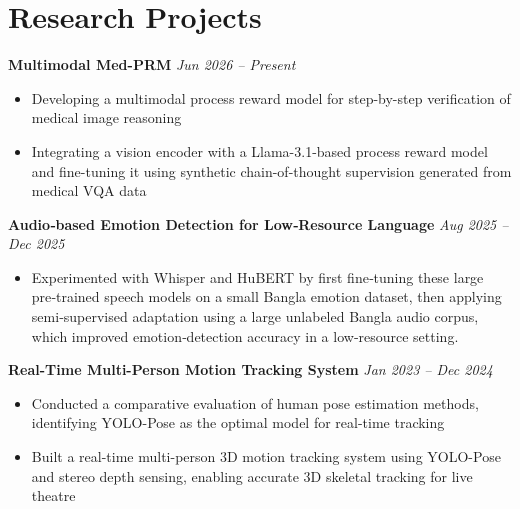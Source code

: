 \documentclass[10pt,letterpaper]{article}
\newcommand{\headingsimple}[2]{%
  \noindent\textbf{#1} \hfill #2\par
}
\begin{document}
\section{Research Projects}

\headingsimple{Multimodal Med-PRM}{\textit{Jun 2026 -- Present}}
\begin{itemize}
  \item Developing a multimodal process reward model for step-by-step verification of medical image reasoning
  \item Integrating a vision encoder with a Llama-3.1-based process reward model and fine-tuning it using synthetic chain-of-thought supervision generated from medical VQA data
\end{itemize}

\headingsimple{Audio‑based Emotion Detection for Low‑Resource Language}{\textit{Aug 2025 -- Dec 2025}}
\begin{itemize}
  \item Experimented with Whisper and HuBERT by first fine‑tuning these large pre‑trained speech models on a small Bangla emotion dataset, then applying semi‑supervised adaptation using a large unlabeled Bangla audio corpus, which improved emotion‑detection accuracy in a low‑resource setting.
\end{itemize}


\headingsimple{Real-Time Multi-Person Motion Tracking System}{\textit{Jan 2023 -- Dec 2024}}
\begin{itemize}
  \item Conducted a comparative evaluation of human pose estimation methods, identifying YOLO-Pose as the optimal model for real-time tracking
  \item Built a real-time multi-person 3D motion tracking system using YOLO-Pose and stereo depth sensing, enabling accurate 3D skeletal tracking for live theatre
\end{itemize}



\end{document}

